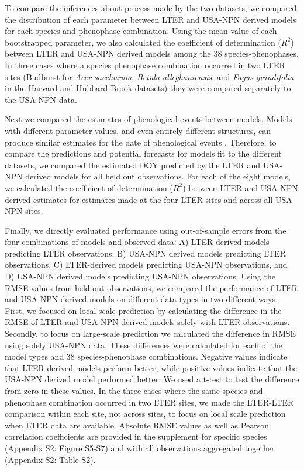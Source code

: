 \documentclass[fleqn,12pt,lineno]{article}
\begin{document}
To compare the inferences about process made by the two datasets, we compared the distribution of each parameter between LTER and USA-NPN derived models for each species and phenophase combination. Using the mean value of each bootstrapped parameter, we also calculated the coefficient of determination ($R^2$) between LTER and USA-NPN derived models among the 38 species-phenophases. In three cases where a species phenophase combination occurred in two LTER sites (Budburst for \textit{Acer saccharum}, \textit{Betula alleghaniensis}, and \textit{Fagus grandifolia} in the Harvard and Hubbard Brook datasets) they were compared separately to the USA-NPN data.

Next we compared the estimates of phenological events between models. Models with different parameter values, and even entirely different structures, can produce similar estimates for the date of phenological events \citep{basler2016}. Therefore, to compare the predictions and potential forecasts for models fit to the different datasets, we compared the estimated DOY predicted by the LTER and USA-NPN derived models for all held out observations. For each of the eight models, we calculated the coefficient of determination ($R^2$) between LTER and USA-NPN derived estimates for estimates made at the four LTER sites and across all USA-NPN sites.  

Finally, we directly evaluated performance using out-of-sample errors from the four combinations of models and observed data: A) LTER-derived models predicting LTER observations, B) USA-NPN derived models predicting LTER observations, C) LTER-derived models predicting USA-NPN observations, and D) USA-NPN derived models predicting USA-NPN observations. Using the RMSE values from held out observations, we compared the performance of LTER and USA-NPN derived models on different data types in two different ways. First, we focused on local-scale prediction by calculating the difference in the RMSE of LTER and USA-NPN derived models solely with LTER observations. Secondly, to focus on large-scale prediction we calculated the difference in RMSE using solely USA-NPN data. These differences were calculated for each of the model types and 38 species-phenophase combinations. Negative values indicate that LTER-derived models perform better, while positive values indicate that the USA-NPN derived model performed better. We used a t-test to test the difference from zero in these values. In the three cases where the same species and phenophase combination occurred in two LTER sites, we made the LTER-LTER comparison within each site, not across sites, to focus on local scale prediction when LTER data are available. Absolute RMSE values as well as Pearson correlation coefficients are provided in the supplement for specific species (Appendix S2: Figure S5-S7) and with all observations aggregated together (Appendix S2: Table S2).
\end{document}
